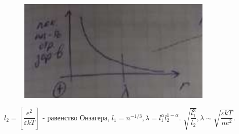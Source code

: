 \begin{lecture}
\begin{lecSection}
\begin{figure}[H]
	
	\centering\includegraphics[width=0.6\linewidth]{lecture_09/pic8}
	
\end{figure}
	
	$l_2 = \left[\dfrac{e^2}{\varepsilon k T}\right]$ - равенство Онзагера, $l_1 = n^{-1/3}, \lambda = l_1^\alpha l_2^{1- \alpha}$. $\sqrt{\dfrac{l_1^3}{l_2}}, \lambda \sim \sqrt{\dfrac{\varepsilon k T}{n e^2}}.$
	
\end{lecSection}
			
\end{lecture}